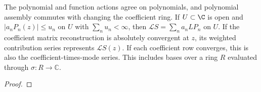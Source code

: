\begin{theorem}
\label{thm:series-differential-operator}
\leanok
The polynomial and function actions agree on polynomials, and polynomial
assembly commutes with changing the coefficient ring.
If $U\subset\C$ is open and $|a_nP_n(z)|\le u_n$ on $U$ with $\sum_n u_n<\infty$, then
$\mathcal LS=\sum_n a_n LP_n$ on $U$.
If the coefficient matrix reconstruction is absolutely convergent at $z$,
its weighted contribution series represents $\mathcal LS(z)$. If each
coefficient row converges, this is also the coefficient-times-mode series.
This includes bases over a ring $R$ evaluated through $\sigma:R\to\mathbb C$.

\end{theorem}
\begin{proof}
\leanok
\end{proof}


